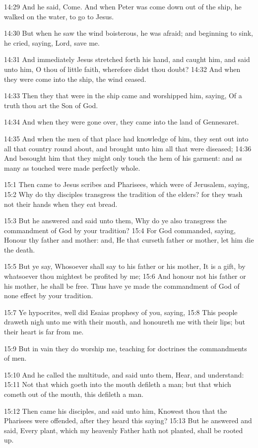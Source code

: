14:29 And he said, Come. And when Peter was come down out of the ship, he walked on the water, to go to Jesus.

14:30 But when he saw the wind boisterous, he was afraid; and beginning to sink, he cried, saying, Lord, save me.

14:31 And immediately Jesus stretched forth his hand, and caught him, and said unto him, O thou of little faith, wherefore didst thou doubt?  14:32 And when they were come into the ship, the wind ceased.

14:33 Then they that were in the ship came and worshipped him, saying, Of a truth thou art the Son of God.

14:34 And when they were gone over, they came into the land of Gennesaret.

14:35 And when the men of that place had knowledge of him, they sent out into all that country round about, and brought unto him all that were diseased; 14:36 And besought him that they might only touch the hem of his garment: and as many as touched were made perfectly whole.

15:1 Then came to Jesus scribes and Pharisees, which were of Jerusalem, saying, 15:2 Why do thy disciples transgress the tradition of the elders? for they wash not their hands when they eat bread.

15:3 But he answered and said unto them, Why do ye also transgress the commandment of God by your tradition?  15:4 For God commanded, saying, Honour thy father and mother: and, He that curseth father or mother, let him die the death.

15:5 But ye say, Whosoever shall say to his father or his mother, It is a gift, by whatsoever thou mightest be profited by me; 15:6 And honour not his father or his mother, he shall be free. Thus have ye made the commandment of God of none effect by your tradition.

15:7 Ye hypocrites, well did Esaias prophesy of you, saying, 15:8 This people draweth nigh unto me with their mouth, and honoureth me with their lips; but their heart is far from me.

15:9 But in vain they do worship me, teaching for doctrines the commandments of men.

15:10 And he called the multitude, and said unto them, Hear, and understand: 15:11 Not that which goeth into the mouth defileth a man; but that which cometh out of the mouth, this defileth a man.

15:12 Then came his disciples, and said unto him, Knowest thou that the Pharisees were offended, after they heard this saying?  15:13 But he answered and said, Every plant, which my heavenly Father hath not planted, shall be rooted up.


